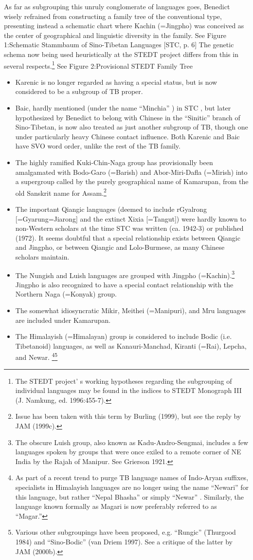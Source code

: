 As far as subgrouping this unruly conglomerate of languages goes, Benedict wisely refrained from constructing a family tree of the conventional type, presenting instead a schematic chart where Kachin (=Jingpho) was conceived as the center of geographical and linguistic diversity in the family. See Figure 1:Schematic Stammbaum of Sino-Tibetan Languages [STC, p. 6] The genetic schema now being used heuristically at the STEDT project differs from this in several respects.\footnote{The STEDT project’ s working hypotheses regarding the subgrouping of individual languages may be  found in the indices to STEDT Monograph III (J. Namkung, ed. 1996:455-7). } See Figure 2:Provisional STEDT Family Tree
\begin{itemize}
\item Karenic is no longer regarded as having a special status, but is now considered to be a subgroup of TB proper.\item Baic, hardly mentioned (under the name “Minchia” ) in STC , but later hypothesized by Benedict to belong with Chinese in the “Sinitic” branch of Sino-Tibetan, is now also treated as just another subgroup of TB, though one under particularly heavy Chinese contact influence. Both Karenic and Baic have SVO word order, unlike the rest of the TB family. \item The highly ramified Kuki-Chin-Naga group has provisionally been amalgamated with Bodo-Garo (=Barish) and Abor-Miri-Dafla (=Mirish) into a supergroup called by the purely geographical name of Kamarupan, from the old Sanskrit name for Assam.\footnote{Issue has been taken with this term by Burling (1999), but see the reply by JAM (1999c).} \item The important Qiangic languages (deemed to include rGyalrong [=Gyarung=Jiarong] and the extinct Xixia [=Tangut]) were hardly known to non-Western scholars at the time STC was written (ca. 1942-3) or published (1972). It seems doubtful that a special relationship exists between Qiangic and Jingpho, or between Qiangic and Lolo-Burmese, as many Chinese scholars maintain. \item The Nungish and Luish languages are grouped with Jingpho (=Kachin).\footnote{The obscure Luish group, also known as Kadu-Andro-Sengmai, includes a few languages spoken by groups that were once exiled to a remote corner of NE India by the Rajah of Manipur. See Grierson 1921.} Jingpho is also recognized to have a special contact relationship with the Northern Naga (=Konyak) group. \item The somewhat idiosyncratic Mikir, Meithei (=Manipuri), and Mru languages are included under Kamarupan. \item The Himalayish (=Himalayan) group is considered to include Bodic (i.e. Tibetanoid) languages, as well as Kanauri-Manchad, Kiranti (=Rai), Lepcha, and Newar. \footnote{As part of a recent trend to purge TB language names of Indo-Aryan suffixes, specialists in Himalayish languages are no longer using the name “Newari” for this language, but rather “Nepal Bhasha” or simply “Newar” . Similarly, the language known formally as Magari is now preferably referred to as “Magar.”}\footnote{Various other subgroupings have been proposed, e.g. “Rungic” (Thurgood 1984) and “Sino-Bodic” (van Driem 1997). See a critique of the latter by JAM (2000b).}

\end{itemize}
